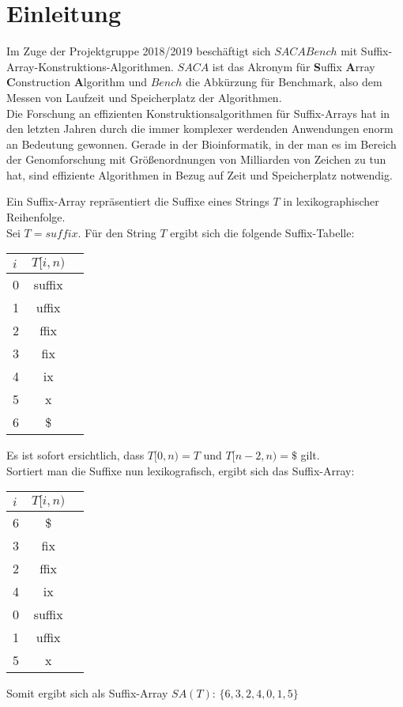 \chapter{Einleitung}

Im  Zuge der Projektgruppe 2018/2019 beschäftigt sich $SACABench$ mit Suffix-Array-Konstruktions-Algorithmen. $SACA$ ist das Akronym für \textbf{S}uffix \textbf{A}rray \textbf{C}onstruction \textbf{A}lgorithm und $Bench$ die Abkürzung für Benchmark, also dem Messen von Laufzeit und Speicherplatz der Algorithmen.\\
Die Forschung an effizienten Konstruktionsalgorithmen für Suffix-Arrays hat in den letzten Jahren durch die immer komplexer werdenden Anwendungen enorm an Bedeutung gewonnen. Gerade in der Bioinformatik, in der man es im Bereich der Genomforschung mit Größenordnungen von Milliarden von Zeichen zu tun hat, sind effiziente Algorithmen in Bezug auf Zeit und Speicherplatz notwendig\cite[ch.~1]{saca:6}.

\noindent Ein Suffix-Array repräsentiert die Suffixe eines Strings $T$ in lexikographischer Reihenfolge. \\
Sei $T=suffix$. Für den String $T$ ergibt sich die folgende Suffix-Tabelle:
\begin{center}
  \begin{tabular}{ | l | c | r }
    \hline
        $i$ & $T[i, n)$ \\ \hline
        0 & suffix \\ \hline
        1 & uffix \\ \hline
        2 & ffix \\ \hline
        3 & fix \\ \hline
        4 & ix \\ \hline
        5 & x \\ \hline
        6 & \$ \\
    \hline
  \end{tabular}
\end{center}
Es ist sofort ersichtlich, dass $T[0, n) = T$ und $T[n-2, n)=\$$ gilt. \\
Sortiert man die Suffixe nun lexikografisch, ergibt sich das Suffix-Array:
\begin{center}
  \begin{tabular}{ | l | c | r }
    \hline
        $i$ & $T[i, n)$ \\ \hline
        6 & \$ \\ \hline
        3 & fix \\ \hline
        2 & ffix \\ \hline
        4 & ix \\ \hline
        0 & suffix \\ \hline
        1 & uffix \\ \hline
        5 & x \\
    \hline
  \end{tabular}
\end{center}
Somit ergibt sich als Suffix-Array $SA(T)$: $\{6,3,2,4,0,1,5\}$

